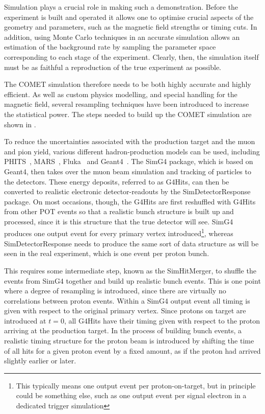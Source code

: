 Simulation plays a crucial role in making such a demonstration. 
Before the experiment is built and operated it allows one to optimise crucial aspects of the geometry and parameters, such as the magnetic field strengths or timing cuts.
In addition, using Monte Carlo techniques in an accurate simulation allows an estimation of the background rate by sampling the parameter space corresponding to each stage of the experiment.
Clearly, then, the simulation itself must be as faithful a reproduction of the true experiment as possible.
\FigSimulationOverview

The COMET simulation therefore needs to be both highly accurate and highly efficient.
As well as custom physics modelling, and special handling for the magnetic field, several resampling techniques have been introduced to increase the statistical power.
The steps needed to build up the COMET simulation are shown in .

To reduce the uncertainties associated with the production target and the muon and pion yield, various different hadron-production models can be used, including PHITS~\cite{PHITS2002}, MARS~\cite{MARS1995}, Fluka~\cite{FLUKA2005} and Geant4~\cite{Geant42003}.
The SimG4 package, which is based on Geant4, then takes over the muon beam simulation and tracking of particles to the detectors.
These energy deposits, referred to as G4Hits, can then be converted to realistic electronic detector-readouts by the SimDetectorResponse package.
On most occasions, though, the G4Hits are first reshuffled with G4Hits from other \acf{POT} events so that a realistic bunch structure is built up and processed, since it is this structure that the true detector will see.
SimG4 produces one output event for every primary vertex introduced\footnote{This typically means one output event per proton-on-target, but in principle could be something else, such as one output event per signal electron in a dedicated trigger simulation}, %
whereas SimDetectorResponse needs to produce the same sort of data structure as will be seen in the real experiment, which is one event per proton bunch.

This requires some intermediate step, known as the SimHitMerger, to shuffle the events from SimG4 together and build up realistic bunch events.
This is one point where a degree of resampling is introduced, since there are virtually no correlations between proton events.
Within a SimG4 output event all timing is given with respect to the original primary vertex.  
Since protons on target are introduced at $t=0$, all G4Hits have their timing given with respect to the proton arriving at the production target.
In the process of building bunch events, a realistic timing structure for the proton beam is introduced by shifting the time of all hits for a given proton event by a fixed amount, as if the proton had arrived slightly earlier or later.

